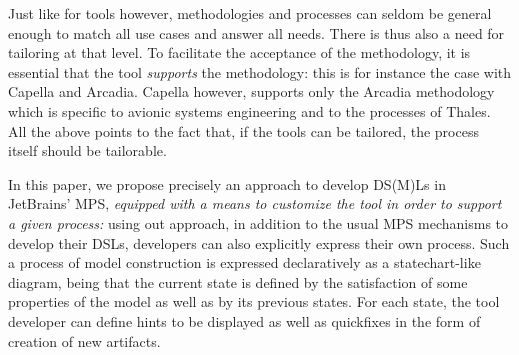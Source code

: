 Just like for tools however, methodologies and processes can seldom be general
enough to match all use cases and answer all needs. There is thus also a need
for tailoring at that level. To facilitate the acceptance of the methodology, it
is essential that the tool \emph{supports} the methodology: this is for instance
the case with Capella and Arcadia.
Capella however, supports only the Arcadia methodology which is specific to
avionic systems engineering and to the processes of Thales.
All the above points to the fact that, if the tools can be tailored, the process
itself should be tailorable.

In this paper, we propose precisely an approach to develop DS(M)Ls in JetBrains'
MPS, \emph{equipped with a means to customize the tool in order to support a
given process:} using out approach, in addition to the usual MPS mechanisms to
develop their DSLs, developers can also explicitly express their own process.
Such a process of model construction is expressed declaratively as a
statechart-like diagram, being that the current state is defined by the
satisfaction of some properties of the model as well as by its previous states.
For each state, the tool developer can define hints to be displayed as well as
quickfixes in the form of creation of new artifacts.


